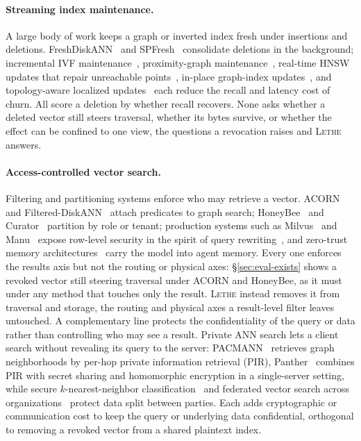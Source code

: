\documentclass[sigconf, nonacm, review]{acmart}
\begin{document}
\paragraph{Streaming index maintenance.}
A large body of work keeps a graph or inverted index fresh under insertions
and deletions. Fresh\-Disk\-ANN~\cite{DBLP:journals/corr/abs-2105-09613} and
SPFresh~\cite{DBLP:conf/sosp/XuLLXCZLYYYCY23} consolidate deletions in the
background; incremental IVF maintenance~\cite{DBLP:journals/corr/abs-2411-00970},
proximity-graph maintenance~\cite{DBLP:journals/corr/abs-2206-10839},
real-time HNSW updates that repair unreachable
points~\cite{DBLP:journals/corr/abs-2407-07871}, in-place graph-index
updates~\cite{DBLP:journals/corr/abs-2502-13826}, and topology-aware
localized updates~\cite{DBLP:journals/pvldb/YuLGXLZSZLY25} each reduce the
recall and latency cost of churn. All score a
deletion by whether recall recovers. None asks whether a deleted vector still
steers traversal, whether its bytes survive, or whether the effect can be
confined to one view, the questions a revocation raises and \textsc{Lethe}
answers.

\paragraph{Access-controlled vector search.}
Filtering and partitioning systems enforce who may retrieve a vector.
ACORN~\cite{DBLP:journals/pacmmod/PatelKGZ24} and
Filtered-DiskANN~\cite{DBLP:conf/www/GollapudiKSKBRL23} attach predicates to
graph search; HoneyBee~\cite{DBLP:journals/corr/abs-2505-01538} and
Curator~\cite{DBLP:journals/corr/abs-2401-07119} partition by role or tenant;
production systems such as Milvus~\cite{DBLP:conf/sigmod/WangYGJXLWGLXYY21}
and Manu~\cite{DBLP:journals/pvldb/GuoLXYYLCXLLCQW22} expose row-level
security in the spirit of query rewriting~\cite{DBLP:conf/sigmod/RizviMSR04},
and zero-trust memory architectures~\cite{DBLP:journals/corr/abs-2601-07004}
carry the model into agent memory. Every one enforces the results
axis but not the routing or physical axes: \S\ref{sec:eval-exists} shows a revoked vector
still steering traversal under ACORN and HoneyBee, as it must under any
method that touches only the result. \textsc{Lethe} instead removes it from
traversal and storage, the routing and physical axes a result-level
filter leaves untouched. A complementary line protects the
confidentiality of the query or data rather than controlling who may see a
result. Private ANN search lets a client search without
revealing its query to the server: PACMANN~\cite{DBLP:conf/iclr/ZhouSF25}
retrieves graph neighborhoods by per-hop private information retrieval (PIR),
Panther~\cite{DBLP:conf/ccs/LiHZ0L0C25} combines PIR
with secret sharing and homomorphic encryption in a single-server setting, while
secure $k$-nearest-neighbor classification~\cite{DBLP:journals/popets/ShaulFR20}
and federated vector search across
organizations~\cite{DBLP:journals/pacmmod/ZhangWXPX24,DBLP:journals/pvldb/ZhuFZSXZD24,DBLP:journals/pvldb/FanZZT25} protect data split between
parties. Each adds cryptographic or communication cost to keep the query or
underlying data confidential, orthogonal to removing a revoked vector from a
shared plaintext index.
\end{document}
